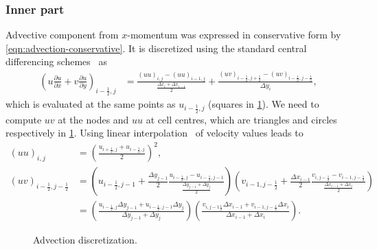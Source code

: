 \documentclass{article}
\numberwithin{equation}{section}
\begin{document}
\subsubsection{Inner part}\label{subsubsec:advection-inner}
Advective component from $x$-momentum was expressed in conservative form by \cref{eqn:advection-conservative}. It is discretized using the standard central differencing schemes~\cite{Colonius:2008} as
\begin{align}\label{eqn:adv-inner}
	\left (u\frac{\partial u}{\partial x}+v \frac{\partial u}{\partial y}\right)_{i-\frac{1}{2},j}&=\frac{(uu)_{i
	,j}-(uu)_{i- 1,j}}{\frac{\Delta x_i+\Delta x_{i-1}}{2}}+\frac{(uv)_{i-\frac{1}{2},j+\frac{1}{2}}-(uv)_{i-\frac{1}{2},j-\frac{1}{2}}}{\Delta y_i},
\end{align}
which is evaluated at the same points as $u_{i-\frac{1}{2},j}$ (squares in \cref{fig:ADV}). We need to compute $uv$ at the nodes and $uu$ at cell centres, which are triangles and circles respectively in \cref{fig:ADV}. Using linear interpolation~\cite{Colonius:2008} of velocity values leads to
\begin{align*}
  (uu)_{i,j}&=\left(\frac{u_{i+\frac{1}{2},j}+u_{i-\frac{1}{2},j}}{2}\right)^2,\\
  (uv)_{i-\frac{1}{2},j-\frac{1}{2}}&=\left(u_{i-\frac{1}{2},j-1} + \frac{\Delta y_{j-1}}{2}\frac{u_{i-\frac{1}{2},j}-u_{i-\frac{1}{2},j-1}}{\frac{\Delta y_{j-1} +\Delta y_j}{2}} \right) \left( v_{i-1,j-\frac{1}{2}} + \frac{\Delta x_{i-1}}{2}\frac{v_{i,j-\frac{1}{2}}-v_{i-1,j-\frac{1}{2}}}{\frac{\Delta x_{i-1} +\Delta x_i}{2}}\right)\\
  &=\left(\frac{u_{i-\frac{1}{2},j}\Delta y_{j-1} +u_{i-\frac{1}{2},j-1}\Delta y_j}{\Delta y_{j-1}+\Delta y_{j}}\right )\left ( \frac{v_{i,j-1\frac{1}{2}}\Delta x_{i-1} +v_{i-1,j-\frac{1}{2}}\Delta x_i}{\Delta x_{i-1}+\Delta x_{i}}\right).
\end{align*}

\begin{figure}[H] %
  \caption{Advection discretization.}\label{fig:ADV}
\end{figure}
\end{document}
